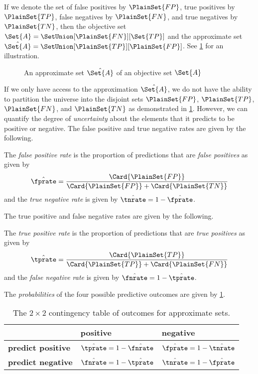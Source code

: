 \documentclass[../main.tex]{subfiles}
\begin{document}
If we denote the set of false positives by $\PlainSet{FP}$, true positives by $\PlainSet{TP}$, false negatives by $\PlainSet{FN}$, and true negatives by $\PlainSet{TN}$, then the objective set $\Set{A}=\SetUnion[\PlainSet{FN}][\Set{TP}]$ and the approximate set $\hat{\Set{A}}=\SetUnion[\PlainSet{TP}][\PlainSet{FP}]$.
See \cref{fig:ex_approx_set} for an illustration.
\begin{figure}[ht]
	\caption{An approximate set $\hat{\Set{A}}$ of an objective set $\Set{A}$}
	\label{fig:ex_approx_set}
	\centering
	\def\svgwidth{\columnwidth/4}
	
\end{figure}

If we only have access to the approximation $\hat{\Set{A}}$, we do not have the ability to partition the universe into the disjoint sets $\PlainSet{FP}$, $\PlainSet{TP}$, $\PlainSet{FN}$, and $\PlainSet{TN}$ as demonstrated in \cref{fig:ex_approx_set}.
However, we can quantify the degree of \emph{uncertainty} about the elements that it predicts to be positive or negative.
The false positive and true negative rates are given by the following.
\begin{definition}
	\label{def:fprate}
	The \emph{false positive rate} is the proportion of predictions that are \emph{false positives} as given by
	\begin{equation}
	\hat{\fprate} = \frac{\Card{\PlainSet{FP}}}{\Card{\PlainSet{FP}} + \Card{\PlainSet{TN}}}
	\end{equation}
	and the \emph{true negative rate} is given by $\hat{\tnrate} = 1 - \hat{\fprate}$.
\end{definition}
The true positive and false negative rates are given by the following.
\begin{definition}
	The \emph{true positive rate} is the proportion of predictions that are \emph{true positives} as given by
	\begin{equation}
	\hat{\tprate} = \frac{\Card{\PlainSet{TP}}}{\Card{\PlainSet{TP}} + \Card{\PlainSet{FN}}}
	\end{equation}
	and the \emph{false negative rate} is given by $\hat{\fnrate} = 1 - \hat{\tprate}$.
\end{definition}

The \emph{probabilities} of the four possible predictive outcomes are given by 
\cref{tbl:contingency_table}.
\begin{table}[ht]
	\centering
	\begin{tabular}{@{} l l l @{}}
		\toprule
		& \textbf{positive} & \textbf{negative}\\
		\midrule
		\textbf{predict positive} & $\hat{\tprate}=1-\hat{\fnrate}$ & 
		$\hat{\fprate}=1-\hat{\tnrate}$\\
		\textbf{predict negative} & $\hat{\fnrate}=1-\hat{\tprate}$ & 
		$\hat{\tnrate}=1-\hat{\fprate}$\\
		\bottomrule
	\end{tabular}
	\caption{The $2 \times 2$ contingency table of outcomes for approximate sets.}
	\label{tbl:contingency_table}        
\end{table}
\end{document}
